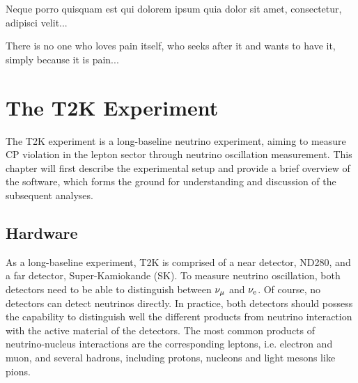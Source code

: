\begin{savequote}[8cm]
\textlatin{Neque porro quisquam est qui dolorem ipsum quia dolor sit amet, consectetur, adipisci velit...}

There is no one who loves pain itself, who seeks after it and wants to have it, simply because it is pain...
\end{savequote}

\chapter{\label{ch:3-t2k}The T2K Experiment} 

\minitoc
The T2K experiment is a long-baseline neutrino experiment, aiming to measure CP violation in the lepton sector through neutrino oscillation measurement.
This chapter will first describe the experimental setup and provide a brief overview of the software, which forms the ground for understanding and discussion of the subsequent analyses.


\section{Hardware}
  As a long-baseline experiment, T2K is comprised of a near detector, ND280, and a far detector, Super-Kamiokande (SK).
  To measure neutrino oscillation, both detectors need to be able to distinguish between $\nu_{\mu}$ and $\nu_{\textrm{e}}$.  
  Of course, no detectors can detect neutrinos directly.
  In practice, both detectors should possess the capability to distinguish well the different products from neutrino interaction with the active material of the detectors.
  The most common products of neutrino-nucleus interactions are the corresponding leptons, i.e. electron and muon, and several hadrons, including protons, nucleons and light mesons like pions.

